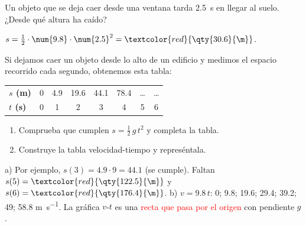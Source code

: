 \begin{exercise}
    Un objeto que se deja caer desde una ventana tarda \qty{2.5}{\s} en llegar al suelo. ¿Desde qué altura ha caído?
    \begin{solu}
        \(s = \frac{1}{2} \cdot \num{9.8} \cdot \num{2.5}^2 = \textcolor{red}{\qty{30.6}{\m}}\).
    \end{solu}
\end{exercise}

\begin{exercise}
    Si dejamos caer un objeto desde lo alto de un edificio y medimos el espacio recorrido cada segundo, obtenemos esta tabla:
    \begin{center}
        \begin{tabular}{@{}lccccccc@{}}
            \toprule
            \textbf{\(s\) (\unit{\m})} & 0 & \num{4.9} & \num{19.6} & \num{44.1} & \num{78.4} & \ldots & \ldots \\[3pt]
            \textbf{\(t\) (\unit{\s})} & 0 & 1 & 2 & 3 & 4 & 5 & 6 \\
            \bottomrule
        \end{tabular}
    \end{center}
    \begin{enumerate}[label=\alph*)]
        \item Comprueba que cumplen \(s = \frac{1}{2}\, g\, t^2\) y completa la tabla.
        \item Construye la tabla velocidad-tiempo y represéntala.
    \end{enumerate}
    \begin{solu}
        a) Por ejemplo, \(s(3) = \num{4.9} \cdot 9 = \num{44.1}\) (se cumple). Faltan \(s(5) = \textcolor{red}{\qty{122.5}{\m}}\) y \(s(6) = \textcolor{red}{\qty{176.4}{\m}}\).
        b) \(v = \num{9.8}\,t\): 0; \num{9.8}; \num{19.6}; \num{29.4}; \num{39.2}; 49; \num{58.8} \unit{\m\per\s}. La gráfica \(v\)-\(t\) es una \textcolor{red}{recta que pasa por el origen} con pendiente \(g\).
    \end{solu}
\end{exercise}

